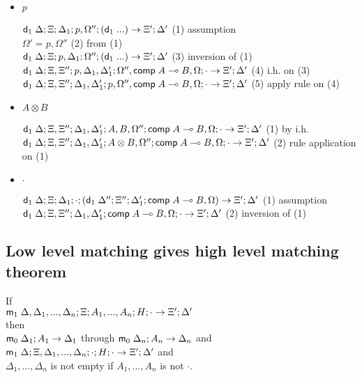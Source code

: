 \documentclass[9pt]{article}
\begin{document}
\begin{itemize}
\item $p$

$\mathsf{d}_1 \; \Delta; \Xi; \Delta_1; p, \Omega''; (\mathsf{d}_1 \; ...) \rightarrow \Xi'; \Delta'$ \hfill (1) assumption \\
$\Omega' = p, \Omega''$ \hfill (2) from (1) \\
$\mathsf{d}_1 \; \Delta; \Xi; p, \Delta_1; \Omega''; (\mathsf{d}_1 \; ...) \rightarrow \Xi'; \Delta'$ \hfill (3) inversion of (1) \\
$\mathsf{d}_1 \; \Delta; \Xi, \Xi''; p, \Delta_1, \Delta'_1; \Omega'', \mathsf{comp} \; A \multimap B, \Omega; \cdot \rightarrow \Xi'; \Delta'$ \hfill (4) i.h. on (3) \\
$\mathsf{d}_1 \; \Delta; \Xi, \Xi''; \Delta_1, \Delta'_1; p, \Omega'', \mathsf{comp} \; A \multimap B, \Omega; \cdot \rightarrow \Xi'; \Delta'$ \hfill (5) apply rule on (4) \\

\item $A \otimes B$

$\mathsf{d}_1 \; \Delta; \Xi, \Xi''; \Delta_1, \Delta'_1; A, B, \Omega''; \mathsf{comp} \; A \multimap B, \Omega; \cdot \rightarrow \Xi'; \Delta'$ \hfill (1) by i.h. \\
$\mathsf{d}_1 \; \Delta; \Xi, \Xi''; \Delta_1, \Delta'_1; A \otimes B, \Omega''; \mathsf{comp} \; A \multimap B, \Omega; \cdot \rightarrow \Xi'; \Delta'$ \hfill (2) rule application on (1) \\

\item $\cdot$

$\mathsf{d}_1 \; \Delta; \Xi; \Delta_1; \cdot; (\mathsf{d}_1 \; \Delta''; \Xi''; \Delta'_1; \mathsf{comp} \; A \multimap B, \Omega) \rightarrow \Xi'; \Delta'$ \hfill (1) assumption \\
$\mathsf{d}_1 \; \Delta; \Xi, \Xi''; \Delta_1, \Delta'_1; \mathsf{comp} \; A \multimap B, \Omega; \cdot \rightarrow \Xi'; \Delta'$ \hfill (2) inversion of (1) \\

\end{itemize}

\subsection{Low level matching gives high level matching theorem}

If \\
$\mathsf{m}_1 \; \Delta, \Delta_1, ..., \Delta_n; \Xi; A_1, ..., A_n; H; \cdot \rightarrow \Xi'; \Delta'$ \\
then \\
$\mathsf{m}_0 \; \Delta_1; A_1 \rightarrow \Delta_1$ through $\mathsf{m}_0 \; \Delta_n; A_n \rightarrow \Delta_n$ and \\
$\mathsf{m}_1 \; \Delta; \Xi, \Delta_1, ..., \Delta_n; \cdot; H; \cdot \rightarrow \Xi'; \Delta'$ and \\
$\Delta_1, ..., \Delta_n$ is not empty if $A_1, ..., A_n$ is not $\cdot$.
\end{document}
